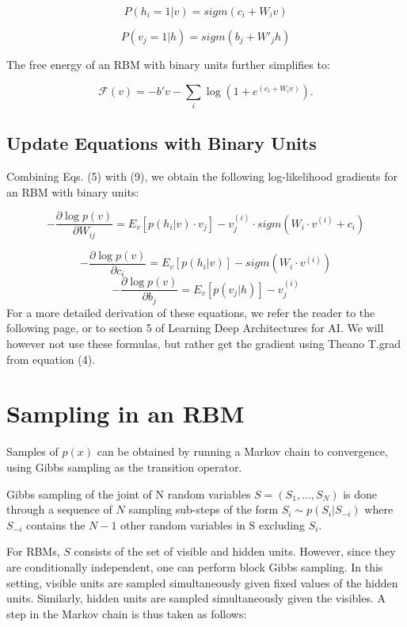 \documentclass[12pt]{article}
\begin{document}
\begin{equation}
P(h_i=1|v) = sigm(c_i + W_i v)
\end{equation}

\begin{equation}
P(v_j=1|h) = sigm(b_j + W'_j h)
\end{equation}

The free energy of an RBM with binary units further simplifies to:

\begin{equation}
\mathcal{F}(v)= - b'v - \sum_i \log(1 + e^{(c_i + W_i v)}).
\end{equation}

\subsection{Update Equations with Binary Units}

Combining Eqs. (5) with (9), we obtain the following log-likelihood gradients for an RBM with binary units:

\begin{equation}
- \frac{\partial{ \log p(v)}}{\partial W_{ij}} =
    E_v[p(h_i|v) \cdot v_j]
    - v^{(i)}_j \cdot sigm(W_i \cdot v^{(i)} + c_i)
\end{equation}

\[-\frac{\partial{ \log p(v)}}{\partial c_i} =
    E_v[p(h_i|v)] - sigm(W_i \cdot v^{(i)})\]
\[-\frac{\partial{ \log p(v)}}{\partial b_j} =
    E_v[p(v_j|h)] - v^{(i)}_j\]
For a more detailed derivation of these equations, we refer the reader to the following page, or to section 5 of Learning Deep Architectures for AI. We will however not use these formulas, but rather get the gradient using Theano T.grad from equation (4).

\section{Sampling in an RBM}

Samples of $p(x)$ can be obtained by running a Markov chain to convergence, using Gibbs sampling as the transition operator.

Gibbs sampling of the joint of N random variables $S=(S_1, ... , S_N)$ is done through a sequence of $N$ sampling sub-steps of the form $S_i \sim p(S_i | S_{-i})$ where $S_{-i}$ contains the $N-1$ other random variables in S excluding $S_i$.

For RBMs, $S$ consists of the set of visible and hidden units. However, since they are conditionally independent, one can perform block Gibbs sampling. In this setting, visible units are sampled simultaneously given fixed values of the hidden units. Similarly, hidden units are sampled simultaneously given the visibles. A step in the Markov chain is thus taken as follows:
\end{document}
